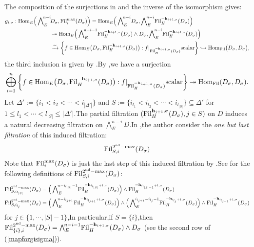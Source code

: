\documentclass[10pt]{article}
\newcommand{\fil}{{\rm Fil}}
\newcommand{\homo}{{\rm Hom}}
\newcommand{\bh}{{\mathbf{h}}}
\begin{document}
The composition of the surjections in \cite[(68) \& (69)]{BDcritical25} and the inverse of the isomorphism \cite[(69)]{BDcritical25} gives:
\begin{equation}\label{mapforgisigma}
	\begin{aligned}
		g_{i,\sigma}:\homo_E\Big(\bigwedge\nolimits_E^{\!n-i}\!&D_{\sigma},\fil_i^{\max}(D_{\sigma})\Big)=\homo_E\Big(\bigwedge\nolimits_E^{\!n-i}\!D_{\sigma},\bigwedge\nolimits_E^{\!n-i}\!\fil_H^{-\bh_{i+1,\sigma}}(D_{\sigma})\Big)\\&\twoheadrightarrow \homo_E\Big(\bigwedge\nolimits_E^{\!n-i-1}\!\fil_H^{-\bh_{i+1,\sigma}}(D_{\sigma})\wedge D_{\sigma} ,\bigwedge\nolimits_E^{\!n-i}\!\fil_H^{-\bh_{i+1,\sigma}}(D_{\sigma})\Big)\\
		&\xrightarrow{\sim}\left\{f\in\homo_E\big(D_{\sigma},\fil_H^{-\bh_{i+1,\sigma}}(D_{\sigma})\big):f|_{\fil_H^{-\bh_{i+1,\sigma}}(D_{\sigma})} \text{scalar}\right\}\hookrightarrow \homo_{\fil}\big(D_{\sigma},D_{\sigma}\big),
	\end{aligned}
\end{equation}
the third inclusion is given by \cite[Lemma 2.2.5 (ii)]{BDcritical25}.\;By \cite[Lemma 2.2.5 (ii)]{BDcritical25},\;we have a surjection
\[\bigoplus_{i=1}^n\left\{f\in\homo_E\big(D_{\sigma},\fil_H^{-\bh_{i+1,\sigma}}(D_{\sigma})\big):f|_{\fil_H^{-\bh_{i+1,\sigma}}(D_{\sigma})} \text{scalar}\right\}\twoheadrightarrow \homo_{\fil}(D_{\sigma},D_{\sigma}).\]
Let $\Delta':=\{i_1<i_2<\cdots<i_{|\Delta'|}\}$ and $S:=\{i_{l_1}<i_{l_2}<\cdots<i_{l_{|S|}}\}\subseteq \Delta'$ for $1\leq l_1<\cdots<l_{|S|}\leq |\Delta'|$.\;The partial filtration $(\fil_H^{\bh_{j+1},\sigma}(D_{\sigma}),j\in S)$  on $D$ induces a natural decreasing filtration on $\bigwedge\nolimits_{E}^{\!n-i}\!D$.\;In  \cite[(97)-(99)]{BDcritical25},\;the author consider the \textit{one but last filtration} of this induced filtration:
\[\fil_{S,i}^{2^{\mathrm{nd}}-\max}(D_{\sigma})\]
Note that $\fil_i^{\max}(D_{\sigma})$ is just the last step of this induced filtration by \cite[Remark 2.3.6,\;(ii)]{BDcritical25}.\;See \cite[(97)-(99)]{BDcritical25} for the following definitions of $\fil_{S,i}^{2^{\mathrm{nd}}-\max}(D_{\sigma})$:
\begin{equation}
	\begin{aligned}
		&\fil_{S,i_{l_{|S|}}}^{2^{\mathrm{nd}}-\max}(D_{\sigma})=\Big(\bigwedge\nolimits_E^{\!n-i_{l_{|S|}}-1}\!\fil_H^{-\bh_{i_{l_{|S|}}+1,\sigma}}(D_{\sigma})\Big)\wedge \fil_H^{-\bh_{i_{l_{|S|-1}}+1,\sigma}}(D_{\sigma})\\
		&\fil_{S,i_{l_{j}}}^{2^{\mathrm{nd}}-\max}(D_{\sigma})=\Big(\bigwedge\nolimits_E^{\!n-i_{l_{j+1}}}\!\fil_H^{-\bh_{i_{l_{j+1}}+1,\sigma}}(D_{\sigma})\Big)\wedge\Big(\bigwedge\nolimits_E^{\!i_{l_{j+1}}-i_{l_{j}}-1}\!\fil_H^{-\bh_{i_{l_{j}}+1,\sigma}}(D_{\sigma})\Big)\wedge \fil_H^{-\bh_{i_{l_{j-1}}+1,\sigma}}(D_{\sigma})
	\end{aligned}
\end{equation}
 for $j\in\{1,\cdots,|S|-1\}$,\;In particular,\;if $S=\{i\}$,\;then $\fil_{\{i\},i}^{2^{\mathrm{nd}}-\max}(D_{\sigma})=\bigwedge\nolimits_E^{\!n-i-1}\!\fil_H^{-\bh_{i+1,\sigma}}(D_{\sigma})\wedge D_{\sigma}$ (see the second row of (\ref{mapforgisigma})).\;
\end{document}
